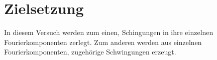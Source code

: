 \section{Zielsetzung}

\label{sec:Zielsetzung}
In diesem Versuch werden zum einen, Schingungen in ihre einzelnen Fourierkomponenten zerlegt.
Zum anderen werden aus einzelnen Fourierkomponenten, zugehörige Schwingungen erzeugt.
